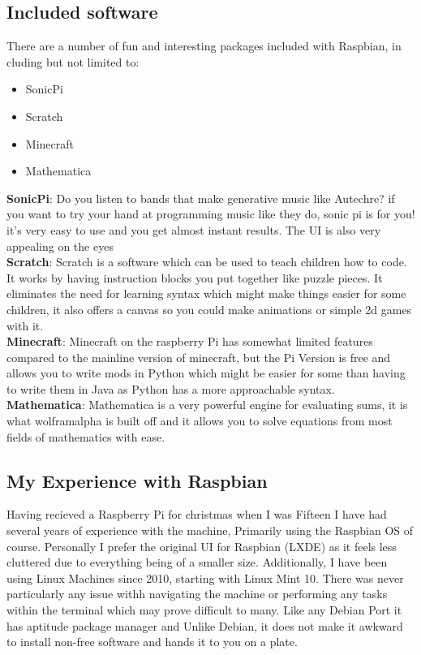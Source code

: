 \documentclass{article}
\begin{document}
	\subsection{Included software}
	There are a number of fun and interesting packages included with Raspbian, in cluding but not limited to:
	\begin{itemize}
		\item SonicPi
		\item Scratch
		\item Minecraft
		\item Mathematica
	\end{itemize}
	\textbf{SonicPi}: Do you listen to bands that make generative music like Autechre? if you want to try your hand at programming music like they do, sonic pi is for you! it's very easy to use and you get almost instant results. The UI is also very appealing on the eyes \\
	\textbf{Scratch}: Scratch is a software which can be used to teach children how to code. It works by having instruction blocks you put together like puzzle pieces. It eliminates the need for learning syntax which might make things easier for some children, it also offers a canvas so you could make animations or simple 2d games with it.\\
	\textbf{Minecraft}: Minecraft on the raspberry Pi has somewhat limited features compared to the mainline version of minecraft, but the Pi Version is free and allows you to write mods in Python which might be easier for some than having to write them in Java as Python has a more approachable syntax.\\
	\textbf{Mathematica}: Mathematica is a very powerful engine for evaluating sums, it is what wolframalpha is built off and it allows you to solve equations from most fields of mathematics with ease.
	\subsection{My Experience with Raspbian}
	Having recieved a Raspberry Pi for christmas when I was Fifteen I have had several years of experience with the machine, Primarily using the Raspbian OS of course. Personally I prefer the original UI for Raspbian (LXDE) as it feels less cluttered due to everything being of a smaller size. Additionally, I have been using Linux Machines since 2010, starting with Linux Mint 10. There was never particularly any issue withh navigating the machine or performing any tasks within the terminal which may prove difficult to many. Like any Debian Port it has aptitude package manager and Unlike Debian, it does not make it awkward to install non-free software and hands it to you on a plate. 
\end{document}

